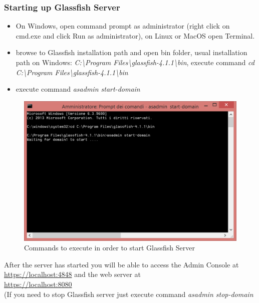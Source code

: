 \subsubsection{Starting up Glassfish Server}
\begin{itemize}
\item On Windows, open command prompt as administrator (right click on cmd.exe and click Run as administrator), on Linux or MacOS open Terminal.
\item browse to Glassfish installation path and open bin folder, usual installation path on Windows: \textit{C:\textbackslash Program Files\textbackslash glassfish-4.1.1\textbackslash bin}, execute command \textit{cd C:\textbackslash Program Files\textbackslash glassfish-4.1.1\textbackslash bin}
\item execute command \textit{asadmin start-domain}
\end{itemize}

\begin{figure}[H]
\begin{center}
		\includegraphics[width=1.1\textwidth]{images/asadminstart}
		\caption{Commands to execute in order to start Glassfish Server}
		\label{asadminstart}
\end{center}
\end{figure}

After the server has started you will be able to access the Admin Console at  \\
\href{url}{https://localhost:4848} and the web server at \\
\href{url}{https://localhost:8080} 
\\(If you need to stop Glassfish server just execute command \textit{asadmin stop-domain}

